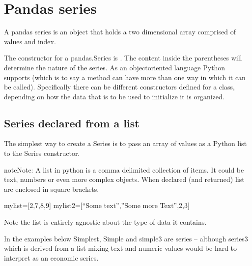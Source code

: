 \documentclass[letterpaper,10pt,english]{jupyterBook}
\begin{document}
\section{Pandas series}
\label{\detokenize{content/04_PythonEssentials/PythonPackagesEtc:pandas-series}}
\sphinxAtStartPar
A pandas series is an object that holds a two dimensional array comprised of values and index.

\sphinxAtStartPar
The constructor for a pandas.Series is .  The content inside the parentheses will determine the nature of the series.  As an object\sphinxhyphen{}oriented language Python supports  (which is to say a method can have more than one way in which it can be called). Specifically there can be different constructors defined for a class, depending on how the data that is to be used to initialize it is organized.


\subsection{Series declared from a list}
\label{\detokenize{content/04_PythonEssentials/PythonPackagesEtc:series-declared-from-a-list}}
\sphinxAtStartPar
The simplest way to create a Series is to pass an array of values as a Python list to the Series constructor.

\begin{sphinxadmonition}{note}{Note:}
\sphinxAtStartPar
A list in python is a comma delimited collection of items.  It could be text, numbers or even more complex objects.  When declared (and returned) list are enclosed in square brackets.

\sphinxAtStartPar
mylist={[}2,7,8,9{]}
mylist2={[}“Some text”,”Some more Text”,2,3{]}

\sphinxAtStartPar
Note the list is entirely agnostic about the type of data it contains.
\end{sphinxadmonition}

\sphinxAtStartPar
In the examples below Simplest, Simple and simple3 are series – although series3 which is derived from a list mixing text and numeric values would be hard to interpret as an economic series.
\end{document}
